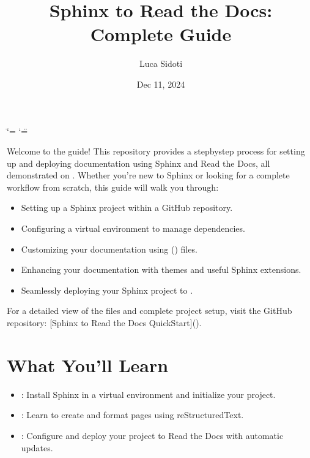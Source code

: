 \documentclass[a4paper,10pt,english]{sphinxmanual}
\title{Sphinx to Read the Docs: Complete Guide}
\date{Dec 11, 2024}
\author{Luca Sidoti}
\begin{document}
\ifdefined\shorthandoff
  \ifnum\catcode`\=\string=\active\shorthandoff{=}\fi
  \ifnum\catcode`\"=\active{}\fi
\fi

\pagestyle{empty}
\sphinxmaketitle
\pagestyle{plain}
\sphinxtableofcontents
\pagestyle{normal}
\label{\detokenize{index::doc}}


\sphinxAtStartPar
Welcome to the  guide! This repository provides a step\sphinxhyphen{}by\sphinxhyphen{}step process for setting up and deploying documentation using Sphinx and Read the Docs, all demonstrated on . Whether you’re new to Sphinx or looking for a complete workflow from scratch, this guide will walk you through:
\begin{itemize}
\item {} 
\sphinxAtStartPar
Setting up a Sphinx project within a GitHub repository.

\item {} 
\sphinxAtStartPar
Configuring a virtual environment to manage dependencies.

\item {} 
\sphinxAtStartPar
Customizing your documentation using  () files.

\item {} 
\sphinxAtStartPar
Enhancing your documentation with themes and useful Sphinx extensions.

\item {} 
\sphinxAtStartPar
Seamlessly deploying your Sphinx project to .

\end{itemize}

\sphinxAtStartPar
For a detailed view of the files and complete project setup, visit the GitHub repository: {[}Sphinx to Read the Docs QuickStart{]}().


\chapter{What You’ll Learn}
\label{\detokenize{index:what-youll-learn}}\begin{itemize}
\item {} 
\sphinxAtStartPar
{}: Install Sphinx in a virtual environment and initialize your project.

\item {} 
\sphinxAtStartPar
{}: Learn to create and format pages using reStructuredText.

\item {} 
\sphinxAtStartPar
{}: Configure and deploy your project to Read the Docs with automatic updates.

\end{itemize}
\end{document}
